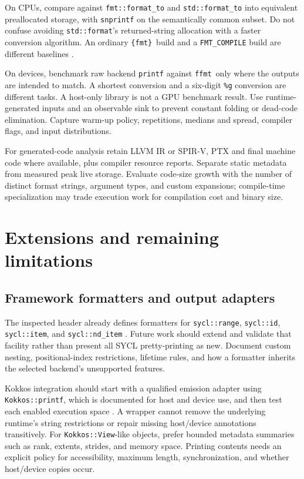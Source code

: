 \documentclass[11pt,letterpaper]{article}
\newcommand{\ffmt}{\texttt{ffmt}}
\newcommand{\fmtlib}{\texttt{\{fmt\}}}
\begin{document}
On CPUs, compare against \texttt{fmt::format\_to} and
\texttt{std::format\_to} into equivalent preallocated storage, with
\texttt{snprintf} on the semantically common subset. Do not confuse avoiding
\texttt{std::format}'s returned-string allocation with a faster conversion
algorithm. An ordinary \fmtlib\ build and a \texttt{FMT\_COMPILE} build are
different baselines \cite{fmt-api}.

On devices, benchmark raw backend \texttt{printf} against \ffmt\ only where
the outputs are intended to match. A shortest conversion and a six-digit
\texttt{\%g} conversion are different tasks. A host-only library is not a
GPU benchmark result. Use runtime-generated inputs and an observable sink to
prevent constant folding or dead-code elimination. Capture warm-up policy,
repetitions, medians and spread, compiler flags, and input distributions.

For generated-code analysis retain LLVM IR or SPIR-V, PTX and final machine
code where available, plus compiler resource reports. Separate static metadata
from measured peak live storage. Evaluate code-size growth with the number of
distinct format strings, argument types, and custom expansions; compile-time
specialization may trade execution work for compilation cost and binary size.

\section{Extensions and remaining limitations}

\subsection{Framework formatters and output adapters}

The inspected header already defines formatters for
\texttt{sycl::range}, \texttt{sycl::id}, \texttt{sycl::item}, and
\texttt{sycl::nd\_item} \cite{ffmt-source}. Future work should extend and
validate that facility rather than present all SYCL pretty-printing as new.
Document custom nesting, positional-index restrictions, lifetime rules, and
how a formatter inherits the selected backend's unsupported features.

Kokkos integration should start with a qualified emission adapter using
\texttt{Kokkos::printf}, which is documented for host and device use, and then
test each enabled execution space \cite{kokkos-printf}. A wrapper cannot
remove the underlying runtime's string restrictions or repair missing
host/device annotations transitively. For \texttt{Kokkos::View}-like objects,
prefer bounded metadata summaries such as rank, extents, strides, and memory
space. Printing contents needs an explicit policy for accessibility, maximum
length, synchronization, and whether host/device copies occur.
\end{document}
